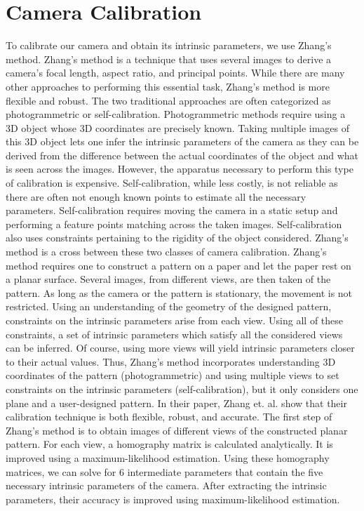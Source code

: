 \section{Camera Calibration}
\label{s:camera}

To calibrate our camera and obtain its intrinsic parameters, we use Zhang’s method. Zhang’s method is a technique that uses several images to derive a camera’s focal length, aspect ratio, and principal points. While there are many other approaches to performing this essential task, Zhang’s method is more flexible and robust. The two traditional approaches are often categorized as photogrammetric or self-calibration. Photogrammetric methods require using a 3D object whose 3D coordinates are precisely known. Taking multiple images of this 3D object lets one infer the intrinsic parameters of the camera as they can be derived from the difference between the actual coordinates of the object and what is seen across the images. However, the apparatus necessary to perform this type of calibration is expensive. Self-calibration, while less costly, is not reliable as there are often not enough known points to estimate all the necessary parameters. Self-calibration requires moving the camera in a static setup and performing a feature points matching across the taken images. Self-calibration also uses constraints pertaining to the rigidity of the object considered.
Zhang’s method is a cross between these two classes of camera calibration. Zhang’s method requires one to construct a pattern on a paper and let the paper rest on a planar surface. Several images, from different views, are then taken of the pattern. As long as the camera or the pattern is stationary, the movement is not restricted. Using an understanding of the geometry of the designed pattern, constraints on the intrinsic parameters arise from each view. Using all of these constraints, a set of intrinsic parameters which satisfy all the considered views can be inferred. Of course, using more views will yield intrinsic parameters closer to their actual values. Thus, Zhang’s method incorporates understanding 3D coordinates of the pattern  (photogrammetric) and using multiple views to set constraints on the intrinsic parameters (self-calibration), but it only considers one plane and a user-designed pattern. In their paper, Zhang et. al. show that their calibration technique is both flexible, robust, and accurate. 
The first step of Zhang’s method is to obtain images of different views of the constructed planar pattern. For each view, a homography matrix is calculated analytically. It is improved using a maximum-likelihood estimation.  Using these homography matrices, we can solve for 6 intermediate parameters that contain the five necessary intrinsic parameters of the camera. After extracting the intrinsic parameters, their accuracy is improved using maximum-likelihood estimation.


